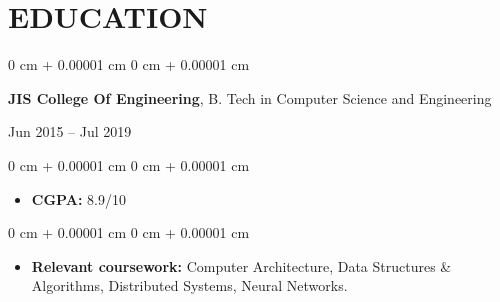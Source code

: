 \documentclass[10pt, letterpaper]{article}
\newenvironment{highlights}{
    \begin{itemize}[
        topsep=0.10 cm,
        parsep=0.10 cm,
        partopsep=0pt,
        itemsep=0pt,
        leftmargin=0 cm + 10pt
    ]
}{
    \end{itemize}
} %
\newenvironment{onecolentry}{
    \begin{adjustwidth}{
        0 cm + 0.00001 cm
    }{
        0 cm + 0.00001 cm
    }
}{
    \end{adjustwidth}
} %
\newenvironment{twocolentry}[2][]{
    \onecolentry
    \def\secondColumn{#2}
    \setcolumnwidth{\fill, 4.5 cm}
    \begin{paracol}{2}
}{
    \switchcolumn \raggedleft \secondColumn
    \end{paracol}
    \endonecolentry
} %
\begin{document}
    \vspace{0.1 cm}
    
    \section{EDUCATION}
    \vspace{0.1 cm}
    
        \begin{twocolentry}{Jun 2015 – Jul 2019}
            \textbf{JIS College Of Engineering}{, B. Tech in Computer Science and Engineering}
        \end{twocolentry}

        \vspace{0.10 cm}
        \begin{onecolentry}
            \begin{highlights}
                \item \textbf{CGPA:} {8.9/10}
            \end{highlights}
        \end{onecolentry}
        \begin{onecolentry}
            \begin{highlights}
                \item \textbf{Relevant coursework: } {Computer Architecture, Data Structures \& Algorithms, Distributed Systems, Neural Networks.}
            \end{highlights}
        \end{onecolentry}
\end{document}

